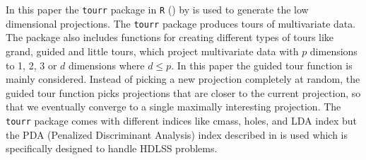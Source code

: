 \documentclass[12]{article}
\begin{document}
In this paper the \texttt{tourr} package in \texttt{R} (\cite{r}) by \cite{WC08} is used to generate the low dimensional projections. The \texttt{tourr} package produces tours of multivariate data. The package also includes functions for creating different types of tours like grand, guided and little tours, which project multivariate data with $p$ dimensions to 1, 2, 3 or $d$ dimensions where $d \le p$. In this paper the guided tour function is mainly considered. Instead of picking a new projection completely at random, the guided tour function picks projections that are closer to the current projection, so that we eventually converge to a single maximally interesting projection. The \texttt{tourr} package comes with different indices like cmass, holes, and LDA index but the PDA (Penalized Discriminant Analysis)  index described in \cite{lee:2009} is used which is specifically designed to handle HDLSS problems. \\     


%
%
\end{document}
